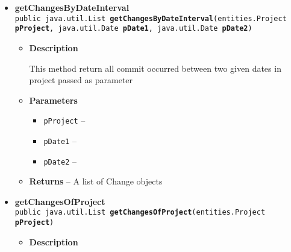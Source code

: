 {{{\begin{itemize}
{\begin{itemize}
{This method return a single commit picked by id
}
\item{
{\bf  Parameters}
  \begin{itemize}
   \item{
\texttt{pId} -- }
  \end{itemize}
}%
\item{{\bf  Returns} -- 
A Change object 
}%
\end{itemize}
}%
\item{ 
\hypertarget{it.unisa.sesa.repominer.db.ChangeDAO.getChangesByDateInterval(it.unisa.sesa.repominer.db.entities.Project, java.util.Date, java.util.Date)}{{\bf  getChangesByDateInterval}\\}
\texttt{public java.util.List\ {\bf  getChangesByDateInterval}(\texttt{entities.Project} {\bf  pProject},
\texttt{java.util.Date} {\bf  pDate1},
\texttt{java.util.Date} {\bf  pDate2})
\label{it.unisa.sesa.repominer.db.ChangeDAO.getChangesByDateInterval(it.unisa.sesa.repominer.db.entities.Project, java.util.Date, java.util.Date)}}%
\begin{itemize}
\item{
{\bf  Description}

This method return all commit occurred between two given dates in project passed as parameter
}
\item{
{\bf  Parameters}
  \begin{itemize}
   \item{
\texttt{pProject} -- }
   \item{
\texttt{pDate1} -- }
   \item{
\texttt{pDate2} -- }
  \end{itemize}
}%
\item{{\bf  Returns} -- 
A list of Change objects 
}%
\end{itemize}
}%
\item{ 
\hypertarget{it.unisa.sesa.repominer.db.ChangeDAO.getChangesOfProject(it.unisa.sesa.repominer.db.entities.Project)}{{\bf  getChangesOfProject}\\}
\texttt{public java.util.List\ {\bf  getChangesOfProject}(\texttt{entities.Project} {\bf  pProject})
\label{it.unisa.sesa.repominer.db.ChangeDAO.getChangesOfProject(it.unisa.sesa.repominer.db.entities.Project)}}%
\begin{itemize}
\item{
{\bf  Description}

}
\end{itemize}}
\end{itemize}}}}
